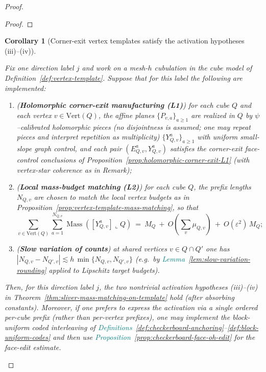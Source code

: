 \documentclass[11pt]{article}
\newcommand{\REVMZ}[1]{\textcolor{teal}{#1}}  %
\numberwithin{equation}{section}  %
\theoremstyle{plain}
\newtheorem{corollary}[theorem]{Corollary}
\theoremstyle{definition}
\theoremstyle{remark}
\DeclareMathOperator{\Mass}{Mass}
\begin{document}
\begin{proof}
\begin{proof}
\end{proof}



\begin{corollary}[Corner-exit vertex templates satisfy the activation hypotheses (iii)--(iv)]\label{cor:corner-exit-iii-iv}

Fix one direction label $j$ and work on a mesh-$h$ cubulation in the cube model of Definition~\ref{def:vertex-template}.
Suppose that for this label the following are implemented:
\begin{enumerate}
\item[\textnormal{(1)}] (\textbf{Holomorphic corner-exit manufacturing (L1)}) for each cube $Q$ and each vertex $v\in\mathrm{Vert}(Q)$,
the affine planes $\{P_{v,a}\}_{a\ge 1}$ {are realized in $Q$ by $\psi$--calibrated holomorphic pieces (no disjointness is assumed; one may repeat pieces and interpret repetition as multiplicity)}
$\{Y_{Q,v}^a\}_{a\ge 1}$ with uniform small-slope graph control, and each pair $(E_{Q,v}^a,Y_{Q,v}^a)$
satisfies the corner-exit face-control conclusions of Proposition~\ref{prop:holomorphic-corner-exit-L1}
(with vertex-star coherence as in Remark);
\item[\textnormal{(2)}] (\textbf{Local mass-budget matching (L2)}) for each cube $Q$, the prefix lengths $N_{Q,v}$ are chosen to match the local
vertex budgets as in Proposition~\ref{prop:vertex-template-mass-matching}, so that
\[
\sum_{v\in\mathrm{Vert}(Q)}\sum_{a=1}^{N_{Q,v}} \Mass([Y_{Q,v}^a]\llcorner Q)
\ =\ M_Q\ +\ O\!\left(\sum_{v}\mu_{Q,v}\right)\ +\ O(\varepsilon^2)\,M_Q;
\]
\item[\textnormal{(3)}] (\textbf{Slow variation of counts}) at shared vertices $v\in Q\cap Q'$ one has
$|N_{Q,v}-N_{Q',v}|\lesssim h\,\min\{N_{Q,v},N_{Q',v}\}$
(e.g.\ by \REVMZ{Lemma~\ref{lem:slow-variation-rounding}} applied to Lipschitz target budgets).
\end{enumerate}
Then, for this direction label $j$, the two nontrivial activation hypotheses \textnormal{(iii)}--\textnormal{(iv)} in
Theorem~\ref{thm:sliver-mass-matching-on-template} hold (after absorbing constants).
Moreover, if one prefers to express the activation via a single ordered per-cube prefix (rather than per-vertex prefixes),
one may implement the block-uniform coded interleaving of \REVMZ{Definitions~\ref{def:checkerboard-anchoring}--\ref{def:block-uniform-codes}}
and then use \REVMZ{Proposition~\ref{prop:checkerboard-face-oh-edit}} for the face-edit estimate.


\end{corollary}
\end{proof}
\end{document}
